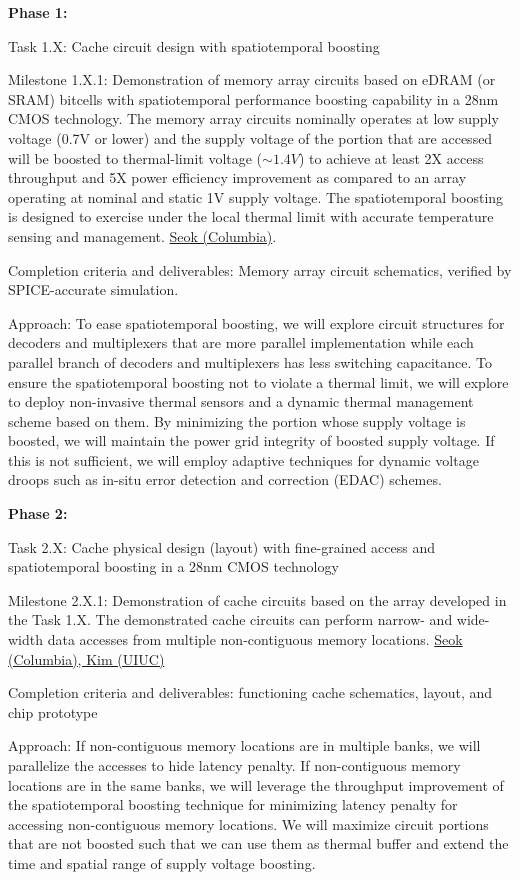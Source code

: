 

\noindent
\textbf{Phase 1:}

Task 1.X: Cache circuit design with spatiotemporal boosting

Milestone 1.X.1: Demonstration of memory array circuits based on eDRAM (or SRAM) bitcells with spatiotemporal performance boosting capability in a 28nm CMOS technology. The memory array circuits nominally operates at low supply voltage (0.7V or lower) and the supply voltage of the portion that are accessed will be boosted to thermal-limit voltage ($\sim 1.4V$) to achieve at least 2X access throughput and 5X power efficiency improvement as compared to an array operating at nominal and static 1V supply voltage. The spatiotemporal boosting is designed to exercise under the local thermal limit with accurate temperature sensing and management. \underline{Seok (Columbia)}. 

   Completion criteria and deliverables: Memory array circuit schematics, verified by SPICE-accurate simulation. 

   Approach: To ease spatiotemporal boosting, we will explore circuit structures for decoders and multiplexers that are more parallel implementation while each parallel branch of decoders and multiplexers has less switching capacitance. To ensure the spatiotemporal boosting not to violate a thermal limit, we will explore to deploy non-invasive thermal sensors and a dynamic thermal management scheme based on them. By minimizing the portion whose supply voltage is boosted, we will maintain the power grid integrity of boosted supply voltage. If this is not sufficient, we will employ adaptive techniques for dynamic voltage droops such as in-situ error detection and correction (EDAC) schemes. 

\noindent
\textbf{Phase 2:}

Task 2.X: Cache physical design (layout) with fine-grained access and spatiotemporal boosting in a 28nm CMOS technology

Milestone 2.X.1: Demonstration of cache circuits based on the array developed in the Task 1.X. The demonstrated cache circuits can perform narrow- and wide-width data accesses from multiple non-contiguous memory locations. \underline{Seok (Columbia), Kim (UIUC)}

   Completion criteria and deliverables: functioning cache schematics, layout, and chip prototype

   Approach: If non-contiguous memory locations are in multiple banks, we will parallelize the accesses to hide latency penalty. If non-contiguous memory locations are in the same banks, we will leverage the throughput improvement of the spatiotemporal boosting technique for minimizing latency penalty for accessing non-contiguous memory locations. We will maximize circuit portions that are not boosted such that we can use them as thermal buffer and extend the time and spatial range of supply voltage boosting. 

